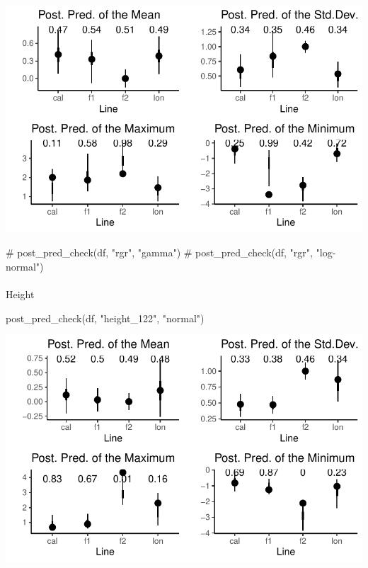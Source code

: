 \documentclass[
  letterpaper,
  DIV=11,
  numbers=noendperiod]{scrartcl}
\makeatletter
\let\oldparagraph\paragraph
\renewcommand{\paragraph}{
    \@ifstar
      \xxxParagraphStar
      \xxxParagraphNoStar
  }
\newcommand{\xxxParagraphStar}[1]{\oldparagraph*{#1}\mbox{}}
\newcommand{\xxxParagraphNoStar}[1]{\oldparagraph{#1}\mbox{}}
\newenvironment{Shaded}{\begin{snugshade}}{\end{snugshade}}
\newcommand{\CommentTok}[1]{\textcolor[rgb]{0.37,0.37,0.37}{#1}}
\newcommand{\FunctionTok}[1]{\textcolor[rgb]{0.28,0.35,0.67}{#1}}
\newcommand{\NormalTok}[1]{\textcolor[rgb]{0.00,0.23,0.31}{#1}}
\newcommand{\StringTok}[1]{\textcolor[rgb]{0.13,0.47,0.30}{#1}}
\makeatother
\begin{document}
\includegraphics{analysis_files/figure-pdf/unnamed-chunk-4-1.pdf}

\begin{Shaded}
\begin{Highlighting}[]
\CommentTok{\# post\_pred\_check(df, "rgr", "gamma")}
\CommentTok{\# post\_pred\_check(df, "rgr", "log{-}normal")}
\end{Highlighting}
\end{Shaded}

\paragraph{Height}\label{height}

\begin{Shaded}
\begin{Highlighting}[]
\FunctionTok{post\_pred\_check}\NormalTok{(df, }\StringTok{"height\_122"}\NormalTok{, }\StringTok{"normal"}\NormalTok{)}
\end{Highlighting}
\end{Shaded}

\includegraphics{analysis_files/figure-pdf/unnamed-chunk-5-1.pdf}
\end{document}

